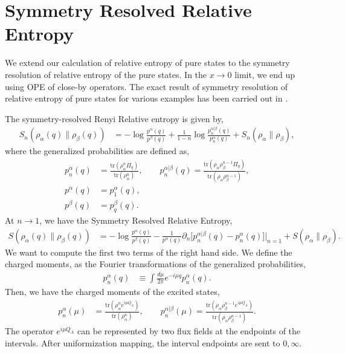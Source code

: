 \documentclass[11pt]{article}
\newcommand{\p}{\partial}
\begin{document}
\section{Symmetry Resolved Relative Entropy}
We extend our calculation of relative entropy of pure states to the symmetry resolution of relative entropy of the pure states. In the $x\to 0$ limit, we end up using OPE of close-by operators. The exact result of symmetry resolution of relative entropy of pure states for various examples has been carried out in \cite{Chen_2021}.

The symmetry-resolved Renyi Relative entropy is given by,
\begin{align}
    S_n(\rho_\alpha(q)\| \rho_\beta(q)) &= -\log\frac{p^\alpha(q)}{p^\beta(q)} + \frac{1}{1-n} \log \frac{p_n^{\alpha|\beta}(q)}{p_n^\alpha(q)} + S_n(\rho_\alpha\|\rho_\beta),
\end{align}
where the generalized probabilities are defined as,
\begin{align}
    p_n^\alpha(q) &= \frac{\text{tr}(\rho_\alpha^n\Pi_q)}{\text{tr}(\rho_\alpha^n)}, \qquad p_n^{\alpha|\beta}(q) = \frac{\text{tr}(\rho_\alpha\rho_\beta^{n-1}\Pi_q)}{\text{tr}(\rho_\alpha\rho_\beta^{n-1})},\\
    p^\alpha(q) &= p_1^\alpha(q),\\
    p^\beta(q) &= p_q^\beta(q).
\end{align}
At $n\to 1$, we have the Symmetry Resolved Relative Entropy,
\begin{align}
    S(\rho_\alpha(q)\|\rho_\beta(q)) &= -\log \frac{p^\alpha(q)}{p^\beta(q)}- \frac{1}{p^\alpha(q)}\p_n \big[p_n^{\alpha|\beta}(q ) - p_n^\alpha(q)\big]\big|_{n=1} + S(\rho_\alpha \|\rho_\beta). 
\end{align}
We want to compute the first two terms of the right hand side. 
We define the charged moments,
as the Fourier transformations of the generalized probabilities,
\begin{align}
    p_n^\alpha(q)&\equiv \int \frac{d\mu}{2\pi} e^{-i\mu q} p_n^\alpha(q).
\end{align}
Then, we have the charged moments of the excited states,
\begin{align}
    p_n^\alpha(\mu) &= \frac{\text{tr}(\rho_\alpha^ne^{i\mu Q_A})}{\text{tr}(\rho_\alpha^n)}, \qquad p_n^{\alpha|\beta}(\mu) = \frac{\text{tr}(\rho_\alpha\rho_\beta^{n-1}e^{i\mu Q_A})}{\text{tr}(\rho_\alpha\rho_\beta^{n-1})}.
\end{align}
The operator $e^{i\mu Q_A}$ can be represented by two flux fields at the endpoints of the intervals. After uniformization mapping, the interval endpoints are sent to $0,\infty$. 
\end{document}
